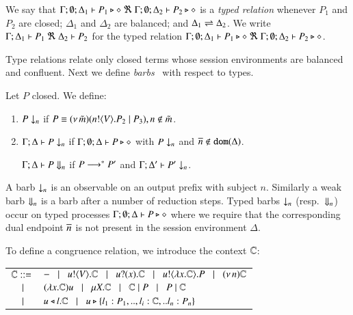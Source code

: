 \smallskip 

\begin{definition}\rm %
	We say that
	$\Gamma; \emptyset; \Delta_1 \vdash P_1 \triangleright \diamond\ \Re \ \Gamma; \emptyset; \Delta_2 \vdash P_2 \triangleright \diamond$
	is a {\em typed relation} whenever $P_1$ and $P_2$ are closed;
		$\Delta_1$ and $\Delta_2$ are balanced; and 
		$\Delta_1 \rightleftharpoons \Delta_2$.
We write
$\horel{\Gamma}{\Delta_1}{P_1}{\ \Re \ }{\Delta_2}{P_2}$
for the typed relation $\Gamma; \emptyset; \Delta_1 \vdash P_1 \triangleright \diamond\ \Re \ \Gamma; \emptyset; \Delta_2 \vdash P_2 \triangleright \diamond$.
\end{definition}

\smallskip 

\noi Type relations relate only closed terms whose
session environments %
are balanced  and confluent.
Next we define  {\em barbs}~\cite{MiSa92}
with respect to types. 

\smallskip 

\begin{definition}[Barbs]\rm
Let $P$ closed. We define:
\begin{enumerate}
		\item	$P \downarrow_{n}$ if $P \equiv (\nu\, \tilde{m})(n ! \langle V \rangle . P_2 \;|\; P_3), n \notin \tilde{m}$. %

		\item	$\Gamma; \Delta \vdash P \downarrow_{n}$ if
			$\Gamma; \emptyset; \Delta \vdash P \triangleright \diamond$ with $P \downarrow_{n}$ and $\overline{n} \notin \mathtt{dom}(\Delta)$.

	$\Gamma; \Delta \vdash P \Downarrow_{n}$ if $P \longrightarrow^* P'$ and
			$\Gamma; \Delta' \vdash P' \downarrow_{n}$.			
	\end{enumerate}
\end{definition}

\smallskip 

\noi A barb $\downarrow_{n}$ is an observable on an output prefix with subject $n$.
Similarly a weak barb $\Downarrow_{n}$ is a barb after a number of reduction steps.
Typed barbs $\downarrow_{n}$ (resp.\ $\Downarrow_{n}$)
occur on typed processes $\Gamma; \emptyset; \Delta \vdash P \triangleright \diamond$
where we require that the corresponding dual endpoint $\overline{n}$ is not present
in the session environment $\Delta$.

To define a congruence relation, we introduce the context ${\Bbb C}$:\\  

\noi 
\begin{tabular}{rl}
	${\Bbb C}::=$\!\!\!\! & $- \;\;\;|\;\;\; u ! \langle V \rangle . {\Bbb C} \;\;\;|\;\;\; u ? (x) . {\Bbb C}
\;\;\;|\;\;\; u ! \langle \lambda x.{\Bbb C} \rangle . P
\;\;\;|\;\;\; (\nu\, n) {\Bbb C}$\\
             $\;\;\;|\;\;\;$\!\!\!\!& $(\lambda x.{\Bbb C})u \;\;\;|\;\;\; \mu X. {\Bbb C} \;\;\;|\;\;\; {\Bbb C} \;|\; P \;\;\;|\;\;\; P \;|\; {\Bbb C}$\\ 
$\;\;\;|\;\;\;$\!\!\!\!& $u \triangleleft l . {\Bbb C} \;\;\;|\;\;\; u \triangleright \{l_1:P_1,..,l_i:{\Bbb C},..l_n:P_n\}$\\
	\end{tabular}
\smallskip 

